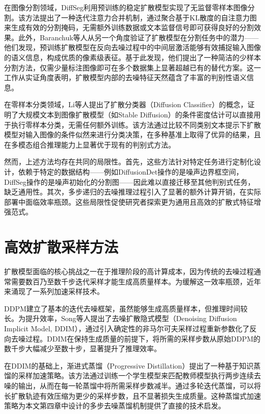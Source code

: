 在图像分割领域，DiffSeg\cite{tian2023diffuse}利用预训练的稳定扩散模型实现了无监督零样本图像分割。该方法提出了一种迭代注意力合并机制，通过聚合基于KL散度的自注意力图来生成有效的分割掩码，无需额外训练数据或文本监督信号即可获得良好的分割效果。此外，Baranchuk等人\cite{baranchuk2022label}从另一个角度验证了扩散模型在分割任务中的潜力——他们发现，预训练扩散模型在反向去噪过程中的中间层激活能够有效捕捉输入图像的语义信息，构成优质的像素级表征。基于此发现，他们提出了一种简洁的少样本分割方法，仅需少量标注图像即可在多个数据集上显著超越已有的替代方案。这一工作从实证角度表明，扩散模型内部的去噪特征天然蕴含了丰富的判别性语义信息。

在零样本分类领域，Li等人\cite{li2023diffusionclassifier}提出了扩散分类器（Diffusion Classifier）的概念，证明了大规模文本到图像扩散模型（如Stable Diffusion）的条件密度估计可以直接用于执行零样本分类，无需任何额外训练。该方法通过比较不同类别文本提示下扩散模型对输入图像的条件似然来进行分类决策，在多种基准上取得了优异的结果，且在多模态组合推理能力上显著优于现有的判别式方法。

然而，上述方法均存在共同的局限性。首先，这些方法针对特定任务进行定制化设计，依赖于特定的数据结构——例如DiffusionDet操作的是噪声边界框空间，DiffSeg操作的是噪声初始化的分割图——因此难以直接迁移至其他判别式任务，缺乏通用性。其次，多步递归的去噪推理过程引入了显著的额外计算开销，在实际部署中面临效率瓶颈。这些局限性促使研究者探索更为通用且高效的扩散式特征增强范式。

\section{高效扩散采样方法}

扩散模型面临的核心挑战之一在于推理阶段的高计算成本，因为传统的去噪过程通常需要数百乃至数千步迭代采样才能生成高质量样本。为缓解这一效率瓶颈，近年来涌现了一系列加速采样技术。

DDPM\cite{ho2020denoising}建立了基本的迭代去噪框架，虽然能够生成高质量样本，但推理时间较长。为提升效率，Song等人\cite{song2020denoising}提出了去噪扩散隐式模型（Denoising Diffusion Implicit Model, DDIM），通过引入确定性的非马尔可夫采样过程重新参数化了反向去噪过程。DDIM在保持生成质量的前提下，将所需的采样步数从原始DDPM的数千步大幅减少至数十步，显著提升了推理效率。

在DDIM的基础上，渐进式蒸馏（Progressive Distillation）\cite{salimans2022progressive}提出了一种基于知识蒸馏的采样加速策略。该方法通过训练一个学生模型来匹配教师模型执行两步连续去噪的输出，从而在每一轮蒸馏中将所需采样步数减半。通过多轮迭代蒸馏，可以将长扩散轨迹有效压缩为更少的采样步数，且不显著损失生成质量。这种蒸馏式加速策略为本文第四章中设计的多步去噪蒸馏机制提供了直接的技术启发。

